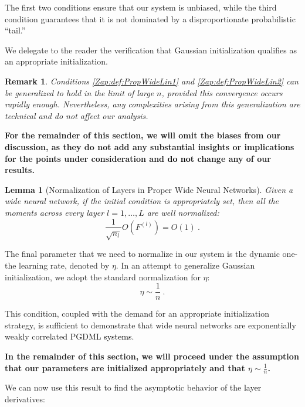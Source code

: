 \documentclass{article} %
\newtheorem{lemma}[theorem]{Lemma}
\newtheorem{remark}{Remark}
[section]
\begin{document}
The first two conditions ensure that our system is unbiased, while the third condition guarantees that it is not dominated by a disproportionate probabilistic ``tail.''

We delegate to the reader the verification that Gaussian initialization qualifies as an appropriate initialization.

\begin{remark}
\textup
{Conditions \ref{Zap:def:PropWideLin1} and \ref{Zap:def:PropWideLin2} can be generalized to hold in the limit of large \(n\), provided this convergence occurs rapidly enough. Nevertheless, any complexities arising from this generalization are technical and do not affect our analysis.}
\end{remark}

\textbf{For the remainder of this section, we will omit the biases from our discussion, as they do not add any substantial insights or implications for the points under consideration and \textcolor{black}{do not} change any of our results.}

\begin{lemma}[Normalization of Layers in Proper Wide Neural Networks]
\label{Zap:lem:LayersNormPropWNN}
\textup
{Given a wide neural network, if the initial condition is appropriately set, then all the moments across every layer \(l=1,\ldots,L\) are well normalized:
\begin{equation}
\frac{1}{\sqrt{n_{l}}}O\left(F^{(l)}\right)=O\left(1\right) \ .
\end{equation}
}
\end{lemma}

The final parameter that we need to normalize in our system is the dynamic one-the learning rate, denoted by \(\eta\).
In an attempt to generalize Gaussian initialization, we adopt the standard normalization for \(\eta\):
\begin{equation}
\eta\sim\frac{1}{n} \ .
\end{equation}

This condition, coupled with the demand for an appropriate initialization strategy, is sufficient to demonstrate that wide neural networks are exponentially weakly correlated PGDML \textcolor{black}{systems}.

\textbf{In the remainder of this section, we will proceed under the assumption that our parameters are initialized appropriately and that \(\eta\sim\frac{1}{n}\).}

We can now use this result to find the asymptotic behavior of the \textcolor{black}{layer} derivatives:
\end{document}
